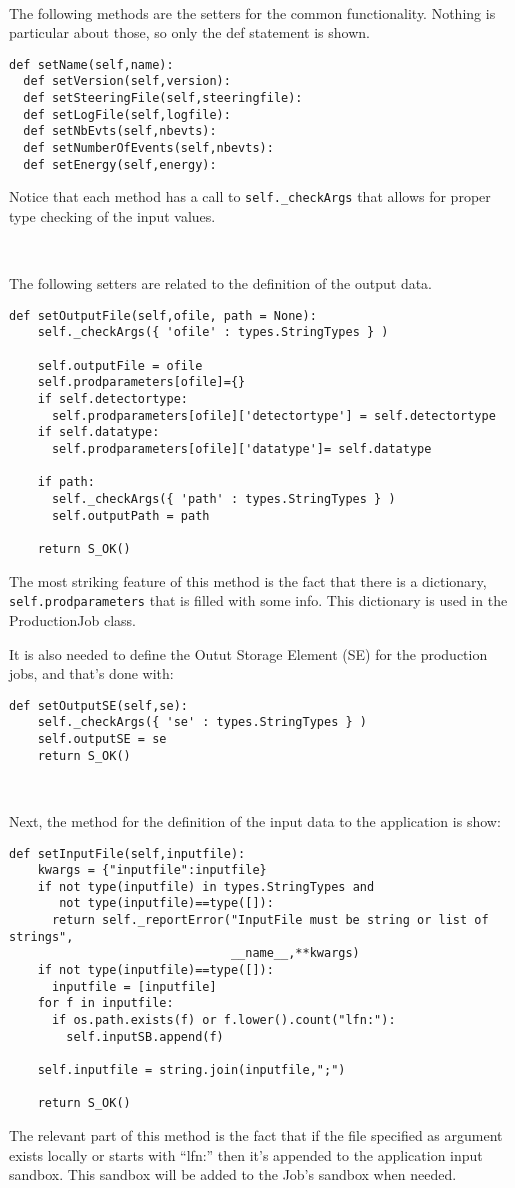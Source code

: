 \documentclass[a4paper,12pt]{article}
\begin{document}
~

The following methods are the setters for the common functionality. Nothing is
particular about those, so only the def statement is shown.
\begin{lstlisting}[firstnumber=118,stepnumber=118,numberfirstline=true]
  def setName(self,name):
  def setVersion(self,version):
  def setSteeringFile(self,steeringfile):
  def setLogFile(self,logfile):
  def setNbEvts(self,nbevts):
  def setNumberOfEvents(self,nbevts):
  def setEnergy(self,energy):
\end{lstlisting}
Notice that each method has a call to \lstinline!self._checkArgs! that allows
for proper type checking of the input values.

~

The following setters are related to the definition of the output data.
\begin{lstlisting}[firstnumber=187]
  def setOutputFile(self,ofile, path = None):
    self._checkArgs({ 'ofile' : types.StringTypes } )
    
    self.outputFile = ofile
    self.prodparameters[ofile]={}
    if self.detectortype:
      self.prodparameters[ofile]['detectortype'] = self.detectortype
    if self.datatype:
      self.prodparameters[ofile]['datatype']= self.datatype
    
    if path:
      self._checkArgs({ 'path' : types.StringTypes } )
      self.outputPath = path
      
    return S_OK()  
\end{lstlisting}
The most striking feature of this method is the fact that there is a dictionary,
\lstinline!self.prodparameters! that is filled with some info. This dictionary
is used in the ProductionJob class.

It is also needed to define the Outut Storage Element (SE) for the production
jobs, and that's done with:
\begin{lstlisting}[firstnumber=210]  
  def setOutputSE(self,se):
    self._checkArgs({ 'se' : types.StringTypes } )
    self.outputSE = se
    return S_OK()
\end{lstlisting}

~

Next, the method for the definition of the input data to the application is
show:
\begin{lstlisting}[firstnumber=221]  
  def setInputFile(self,inputfile):
    kwargs = {"inputfile":inputfile}
    if not type(inputfile) in types.StringTypes and 
       not type(inputfile)==type([]):
      return self._reportError("InputFile must be string or list of strings",
                               __name__,**kwargs)
    if not type(inputfile)==type([]):
      inputfile = [inputfile]
    for f in inputfile:
      if os.path.exists(f) or f.lower().count("lfn:"):
        self.inputSB.append(f)
        
    self.inputfile = string.join(inputfile,";")

    return S_OK()
\end{lstlisting}
The relevant part of this method is the fact that if the file specified as
argument exists locally or starts with ``lfn:'' then it's appended to the
application input sandbox. This sandbox will be added to the Job's sandbox when
needed.
\end{document}

